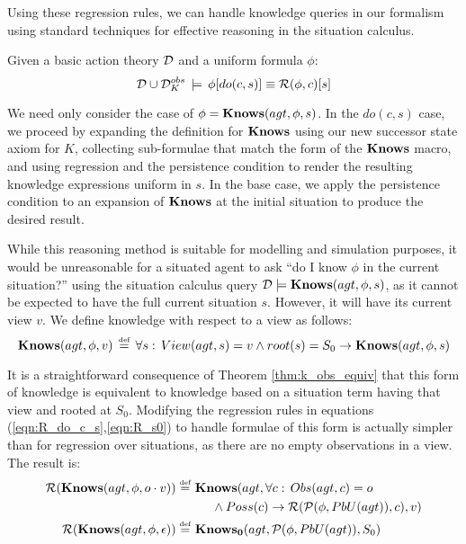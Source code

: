 Using these regression rules, we can handle knowledge queries in our
formalism using standard techniques for effective reasoning in the
situation calculus.

\begin{thm}
\label{thm:Reg_Knows}Given a basic action theory $\mathcal{D}$ and a uniform
formula $\phi$:\[
\mathcal{D}\cup\mathcal{D}_{K}^{obs}\,\models\,\phi[do(c,s)]\equiv\mathcal{R}(\phi,c)[s]\]

\end{thm}
\begin{proofsketch}
We need only consider the case of $\phi=\mathbf{Knows}(agt,\phi,s)$. In the
$do(c,s)$ case, we proceed by expanding the definition for $\mathbf{Knows}$
using our new successor state axiom for $K$, collecting sub-formulae
that match the form of the $\mathbf{Knows}$ macro, and using regression and
the persistence condition to render the resulting knowledge expressions
uniform in $s$. In the base case, we apply the persistence condition
to an expansion of $\mathbf{Knows}$ at the initial situation to produce the
desired result. 
\end{proofsketch}
While this reasoning method is suitable for modelling and simulation
purposes, it would be unreasonable for a situated agent to ask {}``do
I know $\phi$ in the current situation?'' using the situation calculus
query $\mathcal{D}\models\mathbf{Knows}(agt,\phi,s)$, as it cannot be expected
to have the full current situation $s$. However, it will have its
current view $v$. We define knowledge with respect to a view as follows:\[
\mathbf{Knows}(agt,\phi,v)\,\stackrel{\mbox{\tiny def}}{=}\,\forall s:\, View(agt,s)=v\wedge root(s)=S_{0}\rightarrow\mathbf{Knows}(agt,\phi,s)\]


It is a straightforward consequence of Theorem \ref{thm:k_obs_equiv}
that this form of knowledge is equivalent to knowledge based on a
situation term having that view and rooted at $S_{0}$. Modifying
the regression rules in equations (\ref{eqn:R_do_c_s},\ref{eqn:R_s0})
to handle formulae of this form is actually simpler than for regression
over situations, as there are no empty observations in a view. The
result is:\begin{align*}
\mathcal{R}(\mathbf{Knows}(agt,\phi,o\cdot v))\stackrel{\mbox{\tiny def}}{=}\,\, & \mathbf{Knows}(agt,\forall c:\, Obs(agt,c)=o\\
 & \,\,\,\,\,\,\,\,\wedge Poss(c)\rightarrow\mathcal{R}(\mathcal{P}(\phi,PbU(agt)),c),v)\\
\mathcal{R}(\mathbf{Knows}(agt,\phi,\epsilon))\stackrel{\mbox{\tiny def}}{=}\,\, & \mathbf{Knows_{0}}(agt,\mathcal{P}(\phi,PbU(agt)),S_{0})\end{align*}



